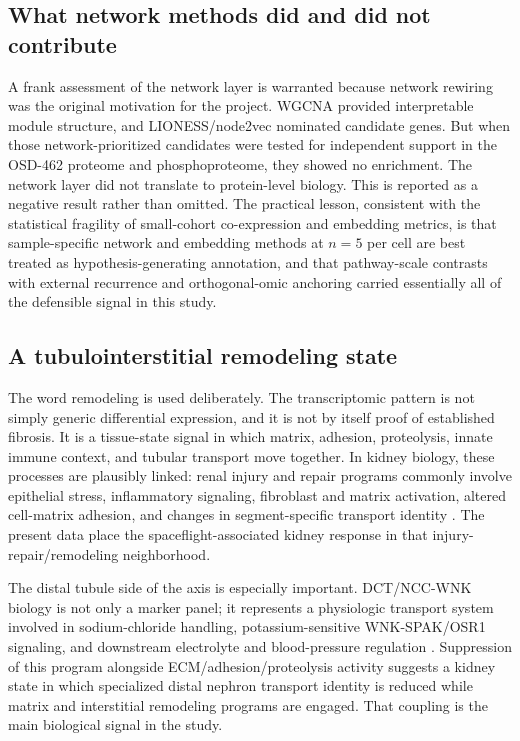 \documentclass[11pt]{article}
\begin{document}
\subsection{What network methods did and did not contribute}

A frank assessment of the network layer is warranted because network rewiring was the original motivation for the project. WGCNA provided interpretable module structure, and LIONESS/node2vec nominated candidate genes. But when those network-prioritized candidates were tested for independent support in the OSD-462 proteome and phosphoproteome, they showed no enrichment. The network layer did not translate to protein-level biology. This is reported as a negative result rather than omitted. The practical lesson, consistent with the statistical fragility of small-cohort co-expression and embedding metrics, is that sample-specific network and embedding methods at $n=5$ per cell are best treated as hypothesis-generating annotation, and that pathway-scale contrasts with external recurrence and orthogonal-omic anchoring carried essentially all of the defensible signal in this study.

\subsection{A tubulointerstitial remodeling state}

The word remodeling is used deliberately. The transcriptomic pattern is not simply generic differential expression, and it is not by itself proof of established fibrosis. It is a tissue-state signal in which matrix, adhesion, proteolysis, innate immune context, and tubular transport move together. In kidney biology, these processes are plausibly linked: renal injury and repair programs commonly involve epithelial stress, inflammatory signaling, fibroblast and matrix activation, altered cell-matrix adhesion, and changes in segment-specific transport identity \citep{liu2011fibrosis,natneph2024fibrosis,jci2024fibrosis,chavula2022cadherin}. The present data place the spaceflight-associated kidney response in that injury-repair/remodeling neighborhood.

The distal tubule side of the axis is especially important. DCT/NCC-WNK biology is not only a marker panel; it represents a physiologic transport system involved in sodium-chloride handling, potassium-sensitive WNK-SPAK/OSR1 signaling, and downstream electrolyte and blood-pressure regulation \citep{castaneda2024dct,ge2016wnk}. Suppression of this program alongside ECM/adhesion/proteolysis activity suggests a kidney state in which specialized distal nephron transport identity is reduced while matrix and interstitial remodeling programs are engaged. That coupling is the main biological signal in the study.
\end{document}
